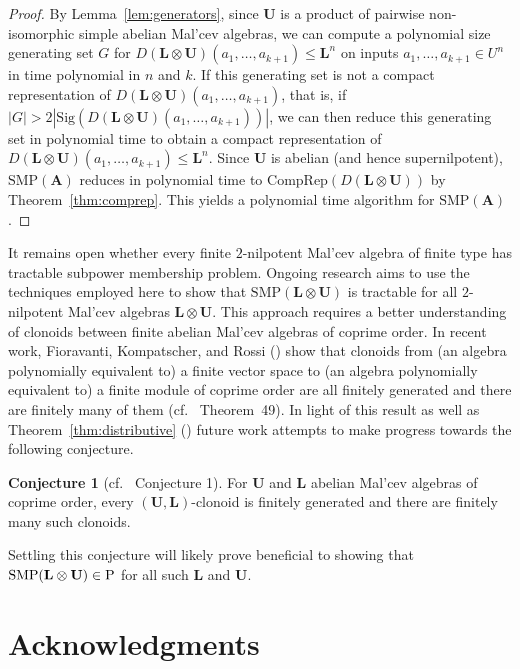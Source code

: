 \documentclass[12pt]{amsart}
\numberwithin{equation}{section}
\theoremstyle{plain}
\theoremstyle{definition}
\newtheorem{conjecture}{Conjecture}
\newcommand{\A}{\mathbf{A}}
\renewcommand{\L}{\mathbf{L}}
\newcommand{\U}{\mathbf{U}}
\newcommand{\SMP}{\text{SMP}}
\begin{document}
\begin{proof}
  By Lemma~\ref{lem:generators}, since $\U$ is a product of pairwise non-isomorphic 
    simple abelian Mal'cev algebras, we can compute a polynomial size generating set $G$ 
    for $D(\L \otimes \U)(a_1, \ldots, a_{k+1}) \le \L^n$ on inputs $a_1, \ldots, a_{k+1} \in U^n$ 
    in time polynomial in $n$ and $k$.
  If this generating set is not a compact representation of $D(\L \otimes \U)(a_1, \ldots, a_{k+1})$, 
    that is,  if $|G| > 2|\text{Sig}(D(\L \otimes \U)(a_1, \ldots, a_{k+1}))|$,
    we can then reduce this generating set in polynomial time to obtain a compact representation of 
    $D(\L \otimes \U)(a_1, \ldots, a_{k+1}) \le \L^n$.
  Since $\U$ is abelian (and hence supernilpotent), $\SMP(\A)$ reduces in polynomial time to 
    $\text{CompRep}(D(\L \otimes \U))$ by Theorem~\ref{thm:comprep}.
  This yields a polynomial time algorithm for $\SMP(\A)$. 
\end{proof}

\smpcor*

It remains open whether every finite $2$-nilpotent Mal'cev algebra of finite type 
  has tractable subpower membership problem.
Ongoing research aims to use the techniques employed here to show that $\SMP(\L \otimes \U)$ is tractable
  for all $2$-nilpotent Mal'cev algebras $\L \otimes \U$.
This approach requires a better understanding of clonoids between finite abelian Mal'cev algebras of coprime order.
In recent work, Fioravanti, Kompatscher, and Rossi (\cite{FKR:CBVS}) show that clonoids from 
  (an algebra polynomially equivalent to) a finite vector space to (an algebra polynomially equivalent to) 
  a finite module of coprime order are all finitely generated and there are finitely many of them (cf. \cite{FKR:CBVS}~Theorem~49).
In light of this result as well as Theorem~\ref{thm:distributive} (\cite[Theorem 1.4]{MaWy:CBM})
  future work attempts to make progress towards the following conjecture.
\begin{conjecture}[cf. \cite{FKR:CBVS}~Conjecture 1]
  For $\U$ and $\L$ abelian Mal'cev algebras of coprime order, every $(\U,\L)$-clonoid is finitely generated
    and there are finitely many such clonoids.
\end{conjecture}
Settling this conjecture will likely prove beneficial to showing that $\SMP(\L \otimes \U) \in \textup{P}$ 
  for all such $\L$ and $\U$.


\section*{Acknowledgments}
\end{document}
